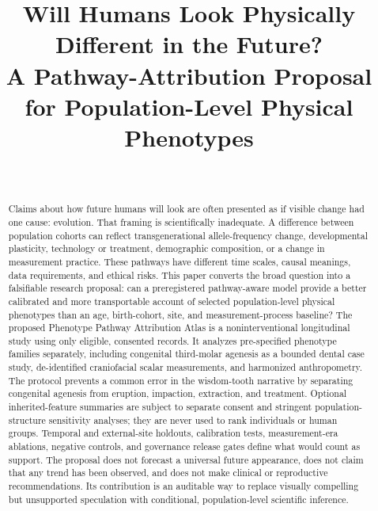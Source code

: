 \documentclass[conference]{IEEEtran}
\begin{document}
\title{Will Humans Look Physically Different in the Future?\\
A Pathway-Attribution Proposal for Population-Level Physical Phenotypes}

\author{\\
}

\maketitle

\begin{abstract}
Claims about how future humans will look are often presented as if visible
change had one cause: evolution. That framing is scientifically inadequate.
A difference between population cohorts can reflect transgenerational
allele-frequency change, developmental plasticity, technology or treatment,
demographic composition, or a change in measurement practice. These pathways
have different time scales, causal meanings, data requirements, and ethical
risks. This paper converts the broad question into a falsifiable research
proposal: can a preregistered pathway-aware model provide a better calibrated
and more transportable account of selected population-level physical
phenotypes than an age, birth-cohort, site, and measurement-process baseline?
The proposed Phenotype Pathway Attribution Atlas is a noninterventional
longitudinal study using only eligible, consented records. It analyzes
pre-specified phenotype families separately, including congenital third-molar
agenesis as a bounded dental case study, de-identified craniofacial scalar
measurements, and harmonized anthropometry. The protocol prevents a common
error in the wisdom-tooth narrative by separating congenital agenesis from
eruption, impaction, extraction, and treatment. Optional inherited-feature
summaries are subject to separate consent and stringent population-structure
sensitivity analyses; they are never used to rank individuals or human
groups. Temporal and external-site holdouts, calibration tests,
measurement-era ablations, negative controls, and governance release gates
define what would count as support. The proposal does not forecast a universal
future appearance, does not claim that any trend has been observed, and does
not make clinical or reproductive recommendations. Its contribution is an
auditable way to replace visually compelling but unsupported speculation with
conditional, population-level scientific inference.
\end{abstract}
\end{document}
